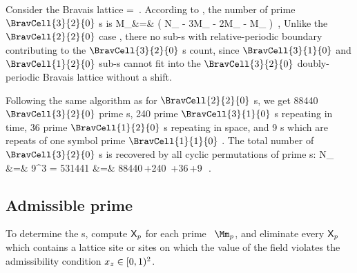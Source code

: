 \bigskip


Consider the Bravais lattice
\beq
\Mm=
\,.
According to , the number of prime %
$\BravCell{3}{2}{0}$ {\lattstate}s is
\bea
M_{}&=&
  \left( N_{}
            - 3M_{}
            - 2M_{}
            - M_{}
  \right)
\,,
\label{catlattM3x2}
\eea
Unlike the $\BravCell{2}{2}{0}$ case , there no sub-\brick s
with relative-periodic boundary contributing to the $\BravCell{3}{2}{0}$ \brick s
count, since $\BravCell{3}{1}{0}$ and $\BravCell{1}{2}{0}$ sub-\brick s cannot fit into
the $\BravCell{3}{2}{0}$ doubly-periodic Bravais lattice without a shift.

Following the same algorithm as for $\BravCell{2}{2}{0}$ \brick s, we get 88440
$\BravCell{3}{2}{0}$ prime \brick s, 240 prime $\BravCell{3}{1}{0}$ \brick
s repeating in time, 36 prime $\BravCell{1}{2}{0}$ \brick s repeating in space,
and 9 \brick s which are repeats of one symbol prime $\BravCell{1}{1}{0}$ \brick.
The total number of $\BravCell{3}{2}{0}$ \brick s is recovered by all cyclic
permutations of prime \brick s:
\bea
N_{} &=& 9^{3} = 531441
    \continue
 &=& 88440\,+240\,
       +36\,+9\,
\,.
\label{catlattN3x2}
\eea



\subsection{Admissible prime \twots}
\label{sect:prime2tAdmiss}

To determine the {\em \admissible} \brick s, compute $\mathsf{X}_p$ for each
prime \brick\ $\Mm_p$, and eliminate every $\mathsf{X}_p$ which contains a
lattice site or sites on which the value of the field violates the
admissibility condition $x_z\in[0,1)^2$.

\ifblog

\fi


